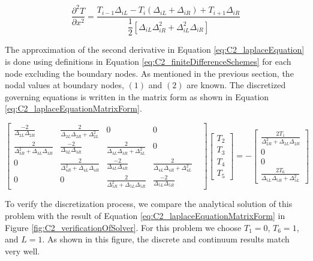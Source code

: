 \begin{equation}\label{eq:C2_finiteDifferenceSchemes}
	\frac{\partial^2 T}{\partial x^2} = 
	\frac{T_{i-1} \Delta_{iL} - 
	      T_{i} (\Delta_{iL} + \Delta_{iR}) + 
	      T_{i+1} \Delta_{iR}}
	     {\dfrac{1}{2} \left[ \Delta_{iL} \Delta_{iR}^2 + 
	                         \Delta_{iL}^2 \Delta_{iR} \right]}
\end{equation}

The approximation of the second derivative in Equation \eqref{eq:C2_laplaceEquation} is done using definitions in Equation \eqref{eq:C2_finiteDifferenceSchemes} for each node excluding the boundary nodes. As mentioned in the previous section, the nodal values at boundary nodes, $(1)$ and $(2)$ are known. The discretized governing equations is written in the matrix form as shown in Equation \eqref{eq:C2_laplaceEquationMatrixForm}.

\begin{equation}\label{eq:C2_laplaceEquationMatrixForm}
	\begin{bmatrix}
		\frac{-2}{\Delta_{2L} \Delta_{2R}} &
		\frac{2}{\Delta_{2L} \Delta_{2R} + \Delta_{2L}^2} &
		0 &
		0 &
		\\
		\frac{2}{\Delta_{3R}^2 + \Delta_{3L} \Delta_{3R}} & 
		\frac{-2}{\Delta_{3L} \Delta_{3R}} &
		\frac{2}{\Delta_{3L} \Delta_{3R} + \Delta_{3L}^2} &
		0
		\\
		0 &
		\frac{2}{\Delta_{4R}^2 + \Delta_{4L} \Delta_{4R}} & 
		\frac{-2}{\Delta_{4L} \Delta_{4R}} &
		\frac{2}{\Delta_{4L} \Delta_{4R} + \Delta_{4L}^2} &
		\\
		0 &
		0 &
		\frac{2}{\Delta_{5R}^2 + \Delta_{5L} \Delta_{5R}} & 
		\frac{-2}{\Delta_{5L} \Delta_{5R}}
	\end{bmatrix}
	\begin{bmatrix}
		T_2 \\
		T_3 \\
		T_4 \\
		T_5
	\end{bmatrix}
	=
	-\begin{bmatrix}
	 	\frac{2T_1}{\Delta_{2R}^2 + \Delta_{2L} \Delta_{2R}} \\
 		0 \\
		0 \\
		\frac{2T_6}{\Delta_{5L} \Delta_{5R} + \Delta_{5L}^2}
	\end{bmatrix}
\end{equation}

To verify the discretization process, we compare the analytical solution of this problem with the result of Equation \eqref{eq:C2_laplaceEquationMatrixForm} in Figure \ref{fig:C2_verificationOfSolver}. For this problem we choose $T_1 = 0$, $T_6 = 1$, and $L = 1$.  As shown in this figure, the discrete and continuum results match very well.

